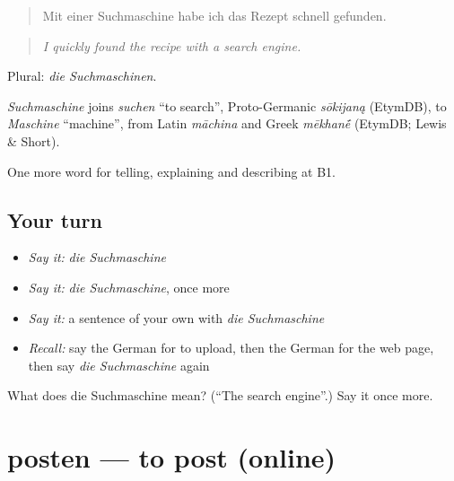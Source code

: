 \begin{quote}
Mit einer Suchmaschine habe ich das Rezept schnell gefunden.
\end{quote}

\begin{quote}
\emph{I quickly found the recipe with a search engine.}
\end{quote}

Plural: \emph{die Suchmaschinen}.

\begin{cousinweb}
\emph{Suchmaschine} joins \emph{suchen} \textquotedblleft{}to search\textquotedblright{}, Proto-Germanic \emph{sōkijaną} (EtymDB), to \emph{Maschine} \textquotedblleft{}machine\textquotedblright{}, from Latin \emph{māchina} and Greek \emph{mēkhan\'{\={e}}} (EtymDB; Lewis \& Short).
\end{cousinweb}

\begin{grammarlens}[title={What you've built}]
One more word for telling, explaining and describing at B1.
\end{grammarlens}

\subsection*{Your turn}
\begin{itemize}
\raggedright
  \item \emph{Say it:} \emph{die Suchmaschine}
  \item \emph{Say it:} \emph{die Suchmaschine}, once more
  \item \emph{Say it:} a sentence of your own with \emph{die Suchmaschine}
  \item \emph{Recall:} say the German for to upload, then the German for the web page, then say \emph{die Suchmaschine} again
\end{itemize}

\begin{tcolorbox}[breakable,colback=teal!4,colframe=teal!35!black,title={Before you move on}]
What does die Suchmaschine mean? (\textquotedblleft{}The search engine\textquotedblright{}.) Say it once more.
\end{tcolorbox}
\section[posten]{posten — to post (online)}

\label{lesson:GE-C394-posten}




